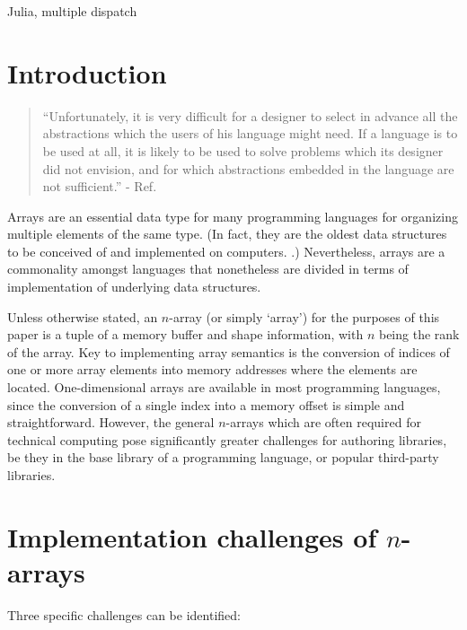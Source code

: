 \documentclass[preprint]{sigplanconf}
\begin{document}

\keywords
Julia, multiple dispatch

\section{Introduction}

\begin{quotation}
``Unfortunately, it is very difficult for a designer to select in advance all
the abstractions which the users of his language might need. If a language is
to be used at all, it is likely to be used to solve problems which its
designer did not envision, and for which abstractions embedded in the language
are not sufficient.'' - Ref. \cite{Liskov:1974pb}
\end{quotation}

Arrays are an essential data type for many programming languages for
organizing multiple elements of the same type. (In fact, they are the oldest
data structures to be conceived of and implemented on computers.
\cite{Zuse:1948ua, Rojas:2000pk, Backus:1956pr}.) Nevertheless, arrays are a
commonality amongst languages that nonetheless are divided in terms of
implementation of underlying data structures.


Unless otherwise stated, an $n$-array (or simply `array') for the purposes of
this paper is a tuple of a memory buffer and shape information, with $n$ being
the rank of the array. Key to implementing array semantics is the conversion
of indices of one or more array elements into memory addresses where the
elements are located. One-dimensional arrays are available in most programming
languages, since the conversion of a single index into a memory offset is
simple and straightforward. However, the general $n$-arrays which are often
required for technical computing pose significantly greater challenges for
authoring libraries, be they in the base library of a programming language, or
popular third-party libraries.

\section{Implementation challenges of $n$-arrays}

Three specific challenges can be identified:
\end{document}
